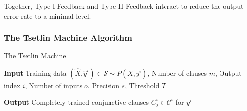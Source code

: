 \documentclass[11pt,a4paper]{article}
\newcommand{\Input}{{\hspace*{\algorithmicindent} \textbf{Input }}}
\newcommand{\Output}{{\hspace*{\algorithmicindent} \textbf{Output }}}
\begin{document}
Together, Type I Feedback and Type II Feedback interact to reduce the output error rate to a minimal level.

\subsubsection{The Tsetlin Machine Algorithm}

\begin{algorithm}
\caption{The Tsetlin Machine}
\label{alg:tsetlin_machine}

\Input{Training data $(\hat{X},\hat{y}^i) \in \mathcal{S} \sim P(X, y^i)$, Number of clauses $m$, Output index $i$, Number of inputs $o$, Precision $s$, Threshold $T$}

\Output{Completely trained conjunctive clauses $C^i_j \in \mathcal{C}^i$ for $y^i$} 

\begin{algorithmic} [1]


\end{algorithmic}
\end{algorithm}
\end{document}
